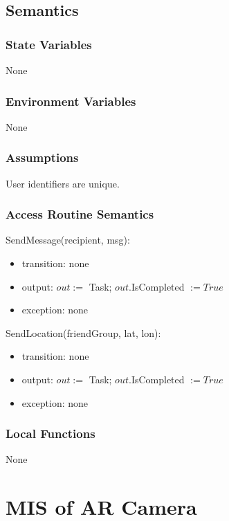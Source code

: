 \documentclass[12pt, titlepage]{article}
\begin{document}
\subsection{Semantics}

\subsubsection{State Variables}

None

\subsubsection{Environment Variables}

None

\subsubsection{Assumptions}

User identifiers are unique.

\subsubsection{Access Routine Semantics}

\noindent SendMessage(recipient, msg):
\begin{itemize}
\item transition: none
\item output: $out :=$ Task; $out$.IsCompleted $:= True$
\item exception: none
\end{itemize}

\noindent SendLocation(friendGroup, lat, lon):
\begin{itemize}
\item transition: none
\item output: $out :=$ Task; $out$.IsCompleted $:= True$
\item exception: none
\end{itemize}

\subsubsection{Local Functions}

None

\newpage

\section{MIS of AR Camera} \label{mARCamera}
\end{document}
